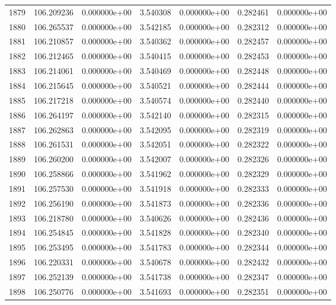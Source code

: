 \begin{tabular}{rrrrrrr}
1879 & 106.209236 &  0.000000e+00 &  3.540308 &  0.000000e+00 &    0.282461 &  0.000000e+00 \\
1880 & 106.265537 &  0.000000e+00 &  3.542185 &  0.000000e+00 &    0.282312 &  0.000000e+00 \\
1881 & 106.210857 &  0.000000e+00 &  3.540362 &  0.000000e+00 &    0.282457 &  0.000000e+00 \\
1882 & 106.212465 &  0.000000e+00 &  3.540415 &  0.000000e+00 &    0.282453 &  0.000000e+00 \\
1883 & 106.214061 &  0.000000e+00 &  3.540469 &  0.000000e+00 &    0.282448 &  0.000000e+00 \\
1884 & 106.215645 &  0.000000e+00 &  3.540521 &  0.000000e+00 &    0.282444 &  0.000000e+00 \\
1885 & 106.217218 &  0.000000e+00 &  3.540574 &  0.000000e+00 &    0.282440 &  0.000000e+00 \\
1886 & 106.264197 &  0.000000e+00 &  3.542140 &  0.000000e+00 &    0.282315 &  0.000000e+00 \\
1887 & 106.262863 &  0.000000e+00 &  3.542095 &  0.000000e+00 &    0.282319 &  0.000000e+00 \\
1888 & 106.261531 &  0.000000e+00 &  3.542051 &  0.000000e+00 &    0.282322 &  0.000000e+00 \\
1889 & 106.260200 &  0.000000e+00 &  3.542007 &  0.000000e+00 &    0.282326 &  0.000000e+00 \\
1890 & 106.258866 &  0.000000e+00 &  3.541962 &  0.000000e+00 &    0.282329 &  0.000000e+00 \\
1891 & 106.257530 &  0.000000e+00 &  3.541918 &  0.000000e+00 &    0.282333 &  0.000000e+00 \\
1892 & 106.256190 &  0.000000e+00 &  3.541873 &  0.000000e+00 &    0.282336 &  0.000000e+00 \\
1893 & 106.218780 &  0.000000e+00 &  3.540626 &  0.000000e+00 &    0.282436 &  0.000000e+00 \\
1894 & 106.254845 &  0.000000e+00 &  3.541828 &  0.000000e+00 &    0.282340 &  0.000000e+00 \\
1895 & 106.253495 &  0.000000e+00 &  3.541783 &  0.000000e+00 &    0.282344 &  0.000000e+00 \\
1896 & 106.220331 &  0.000000e+00 &  3.540678 &  0.000000e+00 &    0.282432 &  0.000000e+00 \\
1897 & 106.252139 &  0.000000e+00 &  3.541738 &  0.000000e+00 &    0.282347 &  0.000000e+00 \\
1898 & 106.250776 &  0.000000e+00 &  3.541693 &  0.000000e+00 &    0.282351 &  0.000000e+00 \\

\end{tabular}
